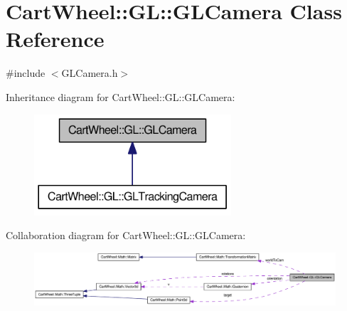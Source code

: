 \hypertarget{classCartWheel_1_1GL_1_1GLCamera}{
\section{CartWheel::GL::GLCamera Class Reference}
\label{classCartWheel_1_1GL_1_1GLCamera}
}


{\ttfamily \#include $<$GLCamera.h$>$}



Inheritance diagram for CartWheel::GL::GLCamera:\nopagebreak
\begin{figure}[H]
\begin{center}
\leavevmode
\includegraphics[width=208pt]{classCartWheel_1_1GL_1_1GLCamera__inherit__graph}
\end{center}
\end{figure}


Collaboration diagram for CartWheel::GL::GLCamera:\nopagebreak
\begin{figure}[H]
\begin{center}
\leavevmode
\includegraphics[width=400pt]{classCartWheel_1_1GL_1_1GLCamera__coll__graph}
\end{center}
\end{figure}
